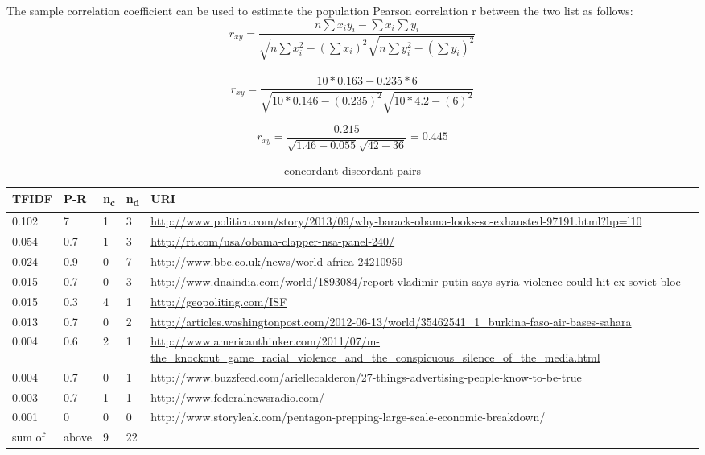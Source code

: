 \documentclass[a4paper,12pt]{article}
\begin{document}
The sample correlation coefficient can be used to estimate the population Pearson correlation r between the two list as follows:
\\
\begin{equation}
r_{xy}= \frac {n \sum x_i y_i - \sum x_i \sum y_i}{\sqrt{n\sum x_i^2 - (\sum x_i)^2}\sqrt{n\sum y_i^2 - (\sum y_i)^2}}
\end{equation}
\\
\begin{displaymath}
r_{xy}= \frac {10 * 0.163 - 0.235 * 6}{\sqrt{10 * 0.146 - (0.235)^2}\sqrt{10 * 4.2 - (6)^2}}
\end{displaymath}


\begin{displaymath}
r_{xy}= \frac {0.215}{\sqrt{1.46 - 0.055}\sqrt{42 - 36}} = 0.445
\end{displaymath}



\pagebreak
\begin{table}

\begin{center}
    \begin{tabular}{ | l | l | l | l | p{10cm} |}
    \hline
    TFIDF & P-R & n\textsubscript{c} & n\textsubscript{d} & URI \\ \hline
    0.102&	7&	1&	3&	\url{http://www.politico.com/story/2013/09/why-barack-obama-looks-so-exhausted-97191.html?hp=l10}\\
0.054&	0.7&	1&	3&	\url{http://rt.com/usa/obama-clapper-nsa-panel-240/}\\
0.024&	0.9&	0&	7&	\url{http://www.bbc.co.uk/news/world-africa-24210959}\\
0.015&	0.7&	0&	3&	http://www.dnaindia.com/world/1893084/report-vladimir-putin-says-syria-violence-could-hit-ex-soviet-bloc\\
0.015&	0.3&	4&	1&	\url{http://geopoliting.com/ISF}\\
0.013&	0.7&	0&	2&	\url{http://articles.washingtonpost.com/2012-06-13/world/35462541_1_burkina-faso-air-bases-sahara}\\
0.004&	0.6&	2&	1&	\url{http://www.americanthinker.com/2011/07/m-the_knockout_game_racial_violence_and_the_conspicuous_silence_of_the_media.html}\\
0.004&	0.7&	0&	1&	\url{http://www.buzzfeed.com/ariellecalderon/27-things-advertising-people-know-to-be-true}\\
0.003&	0.7&	1&	1&	\url{http://www.federalnewsradio.com/}\\
0.001&	0&	0&	0&	http://www.storyleak.com/pentagon-prepping-large-scale-economic-breakdown/

\\
\hline
sum of & above & 9 & 22 & \\
    \hline
    \end{tabular}
\end{center}
\caption{concordant discordant pairs}

\end{table}
\end{document}
